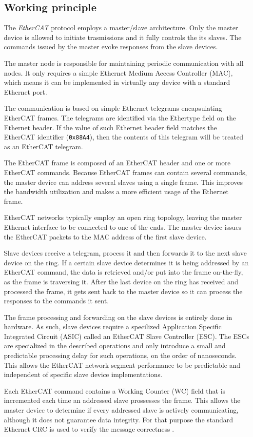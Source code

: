 \subsection{Working principle} \label{subsec:ecat_principle}

The \emph{EtherCAT} protocol employs a master/slave architecture.
Only the master device is allowed to initiate trasmissions and it fully controls the its slaves.
The commands issued by the master evoke responses from the slave devices.

The master node is responsible for maintaining periodic communication with all nodes.
It only requires a simple Ethernet Medium Access Controller (MAC), which means it can be implemented in virtually any device with a standard Ethernet port.

The communication is based on simple Ethernet telegrams encapsulating EtherCAT frames.
The telegrams are identified via the Ethertype field on the Ethernet header.
If the value of such Ethernet header field matches the EtherCAT identifier (\verb|0x88A4|), then the contents of this telegram will be treated as an EtherCAT telegram.

The EtherCAT frame is composed of an EtherCAT header and one or more EtherCAT commands.
Because EtherCAT frames can contain several commands, the master device can address several slaves using a single frame.
This improves the bandwidth utilization and makes a more efficient usage of the Ethernet frame.

EtherCAT networks typically employ an open ring topology, leaving the master Ethernet interface to be connected to one of the ends.
The master device issues the EtherCAT packets to the MAC address of the first slave device.

Slave devices receive a telegram, process it and then forwards it to the next slave device on the ring.
If a certain slave device determines it is being addressed by an EtherCAT command, the data is retrieved and/or put into the frame on-the-fly, as the frame is traversing it.
After the last device on the ring has received and processed the frame, it gets sent back to the master device so it can process the responses to the commands it sent.

The frame processing and forwarding on the slave devices is entirely done in hardware.
As such, slave devices require a specilized Application Specific Integrated Circuit (ASIC) called an EtherCAT Slave Controller (ESC).
The ESCs are specialized in the described operations and only introduce a small and predictable processing delay for such operations, on the order of nanoseconds.
This allows the EtherCAT network segment performance to be predictable and independent of specific slave device implementations.

Each EtherCAT command contains a Working Counter (WC) field that is incremented each time an addressed slave prossesses the frame.
This allows the master device to determine if every addressed slave is actively communicating, although it does not guarantee data integrity.
For that purpose the standard Ethernet CRC is used to verify the message correctness \cite{technology:rte2}.
